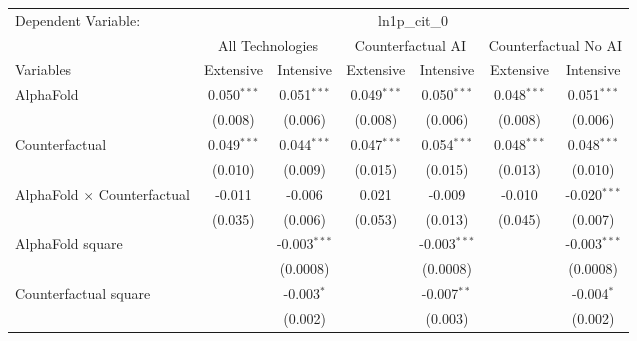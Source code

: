 \begingroup
\centering
\begin{tabular}{lcccccc}
   \tabularnewline \midrule \midrule
   Dependent Variable: & \multicolumn{6}{c}{ln1p\_cit\_0}\\
 & \multicolumn{2}{c}{All Technologies} & \multicolumn{2}{c}{Counterfactual AI} & \multicolumn{2}{c}{Counterfactual No AI} \\
\cmidrule(lr){1-1}\cmidrule(lr){2-3} \cmidrule(lr){4-5} \cmidrule(lr){6-7}
Variables & \multicolumn{1}{c}{Extensive} & \multicolumn{1}{c}{Intensive} & \multicolumn{1}{c}{Extensive} & \multicolumn{1}{c}{Intensive} & \multicolumn{1}{c}{Extensive} & \multicolumn{1}{c}{Intensive} \\
\cmidrule(lr){1-1}\cmidrule(lr){2-2} \cmidrule(lr){3-3} \cmidrule(lr){4-4} \cmidrule(lr){5-5} \cmidrule(lr){6-6} \cmidrule(lr){7-7}
   AlphaFold                          & 0.050$^{***}$ & 0.051$^{***}$  & 0.049$^{***}$ & 0.050$^{***}$  & 0.048$^{***}$ & 0.051$^{***}$\\   
                                      & (0.008)       & (0.006)        & (0.008)       & (0.006)        & (0.008)       & (0.006)\\   
   Counterfactual                     & 0.049$^{***}$ & 0.044$^{***}$  & 0.047$^{***}$ & 0.054$^{***}$  & 0.048$^{***}$ & 0.048$^{***}$\\   
                                      & (0.010)       & (0.009)        & (0.015)       & (0.015)        & (0.013)       & (0.010)\\   
   AlphaFold $\times$ Counterfactual  & -0.011        & -0.006         & 0.021         & -0.009         & -0.010        & -0.020$^{***}$\\   
                                      & (0.035)       & (0.006)        & (0.053)       & (0.013)        & (0.045)       & (0.007)\\   
   AlphaFold square                   &               & -0.003$^{***}$ &               & -0.003$^{***}$ &               & -0.003$^{***}$\\   
                                      &               & (0.0008)       &               & (0.0008)       &               & (0.0008)\\   
   Counterfactual square              &               & -0.003$^{*}$   &               & -0.007$^{**}$  &               & -0.004$^{*}$\\   
                                      &               & (0.002)        &               & (0.003)        &               & (0.002)\\   

\end{tabular}
